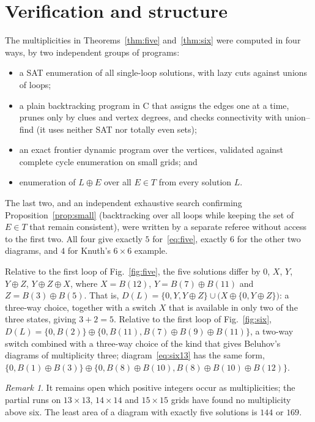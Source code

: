 \documentclass[11pt]{amsart}
\theoremstyle{remark}
\newtheorem{remark}[theorem]{Remark}
\begin{document}
\section{Verification and structure}
The multiplicities in Theorems~\ref{thm:five} and~\ref{thm:six} were computed in four ways, by two independent
groups of programs:
\begin{itemize}
\item a SAT enumeration of all single-loop solutions, with lazy cuts against unions of loops;
\item a plain backtracking program in C that assigns the edges one at a time, prunes only by clues and vertex
degrees, and checks connectivity with union--find (it uses neither SAT nor totally even sets);
\item an exact frontier dynamic program over the vertices, validated against complete cycle enumeration on small
grids; and
\item enumeration of $L\oplus E$ over all $E\in T$ from every solution $L$.
\end{itemize}
The last two, and an independent exhaustive search confirming Proposition~\ref{prop:small} (backtracking over all
loops while keeping the set of $E\in T$ that remain consistent), were written by a separate referee without access to
the first two. All four give exactly $5$ for~\eqref{eq:five}, exactly $6$ for the other two diagrams, and $4$ for
Knuth's $6\times6$ example.

Relative to the first loop of Fig.~\ref{fig:five}, the five solutions differ by
$0$, $X$, $Y$, $Y\oplus Z$, $Y\oplus Z\oplus X$, where $X=B(12)$, $Y=B(7)\oplus B(11)$ and $Z=B(3)\oplus B(5)$.
That is, $D(L)=\{0,Y,Y\oplus Z\}\cup\bigl(X\oplus\{0,Y\oplus Z\}\bigr)$: a three-way choice, together with a switch
$X$ that is available in only two of the three states, giving $3+2=5$. Relative to the first loop of
Fig.~\ref{fig:six}, $D(L)=\{0,B(2)\}\oplus\{0,B(11),B(7)\oplus B(9)\oplus B(11)\}$, a two-way switch combined with a
three-way choice of the kind that gives Beluhov's diagrams of multiplicity three; diagram~\eqref{eq:six13} has the
same form, $\{0,B(1)\oplus B(3)\}\oplus\{0,B(8)\oplus B(10),B(8)\oplus B(10)\oplus B(12)\}$.

\begin{remark}
It remains open which positive integers occur as multiplicities; the partial runs on $13\times13$, $14\times14$ and
$15\times15$ grids have found no multiplicity above six. The least area of a diagram with exactly five solutions is
$144$ or $169$.
\end{remark}
\end{document}
